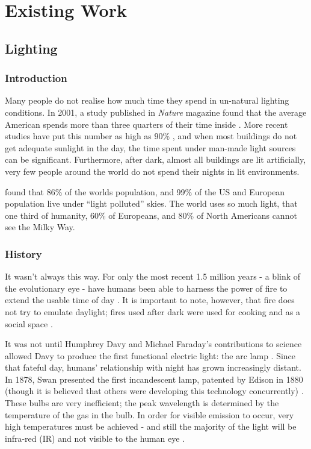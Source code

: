 
\chapter{Existing Work}
\label{Chap:Lit}

\section{Lighting}

\subsection{Introduction}

Many people do not realise how much time they spend in un-natural lighting conditions. In 2001, a study published in \textit{Nature} magazine found that the average American spends more than three quarters of their time inside \citep{klepeisNationalHumanActivity2001}. More recent studies have put this number as high as 90\% \citep{opiniumBritsSpend902018}, and when most buildings do not get adequate sunlight in the day, the time spent under man-made light sources can be significant. Furthermore, after dark, almost all buildings are lit artificially, very few people around the world do not spend their nights in lit environments.

\citet{falchiNewWorldAtlas2016} found that 86\% of the worlds population, and 99\% of the US and European population live under ``light polluted'' skies. The world uses so much light, that one third of humanity, 60\% of Europeans, and 80\% of North Americans cannot see the Milky Way. 

\subsection{History}

It wasn't always this way. For only the most recent 1.5 million years - a blink of the evolutionary eye - have humans been able to harness the power of fire to extend the usable time of day \citep{gowlettEarliestFireAfrica2013}. It is important to note, however, that fire does not try to emulate daylight; fires used after dark were used for cooking and as a social space \citep{gowlettDiscoveryFireHumans2016}.

It was not until Humphrey Davy and Michael Faraday's contributions to science allowed Davy to produce the first functional electric light: the arc lamp \citep{knightHumphryDavyScience1998}. Since that fateful day, humans' relationship with night has grown increasingly distant. In 1878, Swan presented the first  incandescent lamp, patented by Edison in 1880 (though it is believed that others were developing this technology concurrently) %
. These bulbs are very inefficient; the peak wavelength is determined by the temperature of the gas in the bulb. In order for visible emission to occur, very high temperatures must be achieved - and still the majority of the light will be infra-red (IR) and not visible to the human eye \citep{montoyaIndoorLightingTechniques2017}.


